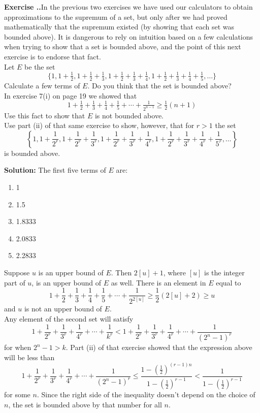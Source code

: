 \documentclass{article}
\newcounter{chapter}[section] %
\newcounter{example}[chapter]
\newcommand{\solution}[1]{\setlength{\hangindent}{\parindent} \indent\indent \textbf{Solution: }#1\hfill\break}
\newcommand{\exercise}[1]{
	
	\refstepcounter{example}
    \hangafter=1
    \setlength{\hangindent}{ 
    	\widthof{
			\large\textbf{Exercise \thesection.\thechapter.\theexample\enspace}
    	}-.5\parindent
    }
    {\setlength{\parindent}{0in}\large\textbf{Exercise \thesection.\thechapter.\theexample\enspace}#1}\hfill\break\par
}
\begin{document}
\exercise{In the previous two exercises we have used our calculators to obtain approximations to the supremum of a set, but only after we had proved mathematically that the supremum existed (by showing that each set was bounded above). It is dangerous to rely on intuition based on a few calculations when trying to show that a set is bounded above, and the point of this next exercise is to endorse that fact. \\\indent Let $E$ be the set $$\{1, 1 + \tfrac{1}{2}, 1 + \tfrac{1}{2} + \tfrac{1}{3}, 1 + \tfrac{1}{2} + \tfrac{1}{3} + \tfrac{1}{4}, 1 + \tfrac{1}{2} + \tfrac{1}{3} + \tfrac{1}{4} + \tfrac{1}{5}, \dots \}$$ Calculate a few terms of $E$. Do you think that the set is bounded above? \\
\indent In exercise 7(i) on page 19 we showed that $$1 + \tfrac{1}{2} + \tfrac{1}{3} + \tfrac{1}{4} + \tfrac{1}{5} + \dotsb + \tfrac{1}{2^{n-1}} \geqslant \tfrac{1}{2} (n+1)$$  Use this fact to show that $E$ is not bounded above. \\ 
\indent Use part (ii) of that same exercise to show, however, that for $r>1$ the set $$\left\{1, 1 + \frac{1}{2^r}, 1 + \frac{1}{2^r} + \frac{1}{3^r}, 1 + \frac{1}{2^r} + \frac{1}{3^r} + \frac{1}{4^r}, 1 + \frac{1}{2^r} + \frac{1}{3^r} + \frac{1}{4^r} + \frac{1}{5^r}, \dots \right\}$$ is bounded above.}
\solution{The first five terms of $E$ are:
\begin{enumerate}
\item 1
\item 1.5
\item 1.8333
\item 2.0833
\item 2.2833
\end{enumerate}
\indent Suppose $u$ is an upper bound of $E$. Then $2[u]+1$, where $[u]$ is the integer part of $u$, is an upper bound of $E$ as well. There is an element in $E$ equal to
$$1 + \frac{1}{2} + \frac{1}{3} + \frac{1}{4} + \frac{1}{5} + \dotsb + \frac{1}{2^{2[u]}} \geqslant \frac{1}{2} (2[u]+2) \geq u$$ 
and $u$ is not an upper bound of $E$. \\
\indent Any element of the second set will satisfy
$$1+ \frac{1}{2^r} + \frac{1}{3^r}+ \frac{1}{4^r} + \dotsb + \frac{1}{k^r} < 1 +\frac{1}{2^r} + \frac{1}{3^r} + \frac{1}{4^r} + \dotsb + \frac{1}{(2^n-1)^r}$$
for when $2^n-1 > k$. Part (ii) of that exercise showed that the expression above will be less than
$$1 + \frac{1}{2^r} + \frac{1}{3^r} + \frac{1}{4^r} + \dotsb + \frac{1}{(2^n-1)^r} \leq \frac{1-\left(\frac{1}{2}\right)^{(r-1)n}}{1-\left(\frac{1}{2}\right)^{r-1}} < \frac{1}{1-\left(\frac{1}{2}\right)^{r-1}}$$ 
for some $n$. Since the right side of the inequality doesn't depend on the choice of $n$, the set is bounded above by that number for all $n$.}%
\end{document}
